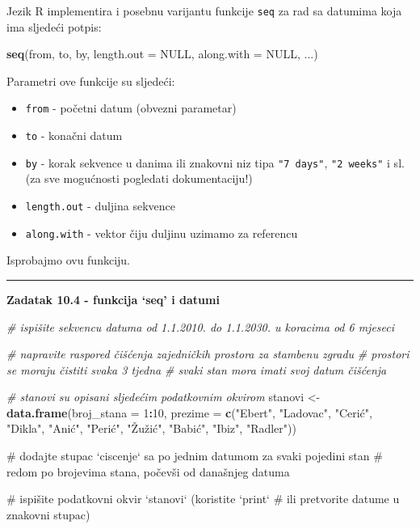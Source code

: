 \documentclass[]{book}
\newenvironment{Shaded}{\begin{snugshade}}{\end{snugshade}}
\newcommand{\KeywordTok}[1]{\textcolor[rgb]{0.13,0.29,0.53}{\textbf{#1}}}
\newcommand{\DataTypeTok}[1]{\textcolor[rgb]{0.13,0.29,0.53}{#1}}
\newcommand{\DecValTok}[1]{\textcolor[rgb]{0.00,0.00,0.81}{#1}}
\newcommand{\StringTok}[1]{\textcolor[rgb]{0.31,0.60,0.02}{#1}}
\newcommand{\CommentTok}[1]{\textcolor[rgb]{0.56,0.35,0.01}{\textit{#1}}}
\newcommand{\OtherTok}[1]{\textcolor[rgb]{0.56,0.35,0.01}{#1}}
\newcommand{\OperatorTok}[1]{\textcolor[rgb]{0.81,0.36,0.00}{\textbf{#1}}}
\newcommand{\NormalTok}[1]{#1}
\providecommand{\tightlist}{%
  \setlength{\itemsep}{0pt}\setlength{\parskip}{0pt}}
\theoremstyle{definition}
\theoremstyle{definition}
\theoremstyle{definition}
\theoremstyle{remark}
\begin{document}
Jezik R implementira i posebnu varijantu funkcije \texttt{seq} za rad sa
datumima koja ima sljedeći potpis:

\begin{Shaded}
\begin{Highlighting}[]
\KeywordTok{seq}\NormalTok{(from, to, by, }\DataTypeTok{length.out =} \OtherTok{NULL}\NormalTok{, }\DataTypeTok{along.with =} \OtherTok{NULL}\NormalTok{, ...)}
\end{Highlighting}
\end{Shaded}

Parametri ove funkcije su sljedeći:

\begin{itemize}
\tightlist
\item
  \texttt{from} - početni datum (obvezni parametar)
\item
  \texttt{to} - konačni datum
\item
  \texttt{by} - korak sekvence u danima ili znakovni niz tipa
  \texttt{"7\ days"}, \texttt{"2\ weeks"} i sl. (za sve mogućnosti
  pogledati dokumentaciju!)
\item
  \texttt{length.out} - duljina sekvence
\item
  \texttt{along.with} - vektor čiju duljinu uzimamo za referencu
\end{itemize}

Isprobajmo ovu funkciju.

\begin{center}\rule{0.5\linewidth}{\linethickness}\end{center}

\textbf{Zadatak 10.4 - funkcija `seq' i datumi}

\begin{Shaded}
\begin{Highlighting}[]
\CommentTok{# ispišite sekvencu datuma od 1.1.2010. do 1.1.2030. u koracima od 6 mjeseci}


\CommentTok{# napravite raspored čišćenja zajedničkih prostora za stambenu zgradu}
\CommentTok{# prostori se moraju čistiti svaka 3 tjedna}
\CommentTok{# svaki stan mora imati svoj datum čišćenja}

\CommentTok{# stanovi su opisani sljedećim podatkovnim okvirom}
\NormalTok{stanovi <-}\StringTok{ }\KeywordTok{data.frame}\NormalTok{(}\DataTypeTok{broj_stana =} \DecValTok{1}\OperatorTok{:}\DecValTok{10}\NormalTok{,}
                      \DataTypeTok{prezime =} \KeywordTok{c}\NormalTok{(}\StringTok{"Ebert"}\NormalTok{, }\StringTok{"Ladovac"}\NormalTok{, }\StringTok{"Cerić"}\NormalTok{, }\StringTok{"Dikla"}\NormalTok{, }\StringTok{"Anić"}\NormalTok{,}
                                  \StringTok{"Perić"}\NormalTok{, }\StringTok{"Žužić", "}\NormalTok{Babić}\StringTok{", "}\NormalTok{Ibiz}\StringTok{", "}\NormalTok{Radler}\StringTok{"))}

\StringTok{# dodajte stupac `ciscenje` sa po jednim datumom za svaki pojedini stan }
\StringTok{# redom po brojevima stana, počevši od današnjeg datuma}


\StringTok{# ispišite podatkovni okvir `stanovi` (koristite `print` }
\StringTok{# ili pretvorite datume u znakovni stupac)}
\end{Highlighting}
\end{Shaded}
\end{document}
